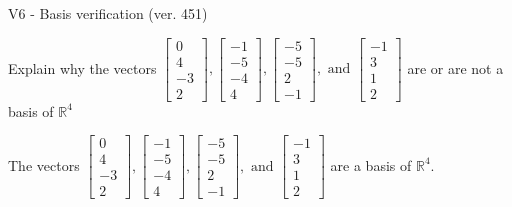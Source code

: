 \begin{exercise}
  \begin{exerciseTitle}V6 - Basis verification (ver. 451)\end{exerciseTitle}
  \begin{exerciseStatement}
    Explain why the vectors \(\left[\begin{array}{r}
0 \\
4 \\
-3 \\
2
\end{array}\right] , \left[\begin{array}{r}
-1 \\
-5 \\
-4 \\
4
\end{array}\right] , \left[\begin{array}{r}
-5 \\
-5 \\
2 \\
-1
\end{array}\right] , \text{ and } \left[\begin{array}{r}
-1 \\
3 \\
1 \\
2
\end{array}\right]\) are or are not a basis of \(\mathbb{R}^4\)	


  \end{exerciseStatement}
  \begin{exerciseAnswer}
   The vectors \(\left[\begin{array}{r}
0 \\
4 \\
-3 \\
2
\end{array}\right] , \left[\begin{array}{r}
-1 \\
-5 \\
-4 \\
4
\end{array}\right] , \left[\begin{array}{r}
-5 \\
-5 \\
2 \\
-1
\end{array}\right] , \text{ and } \left[\begin{array}{r}
-1 \\
3 \\
1 \\
2
\end{array}\right]\) 
  	 are  a basis of \(\mathbb{R}^4\).
  


  \end{exerciseAnswer}
\end{exercise}